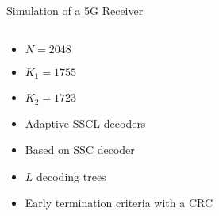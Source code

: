 \begin{frame}{Simulation of a 5G Receiver}
\begin{columns}
\begin{column}[T]{4cm}
    \begin{itemize}
      \item $N = 2048$
      \item $K_1 = 1755$
      \item $K_2 = 1723$
      \vspace{0.3cm}
      \item Adaptive SSCL decoders
      \item Based on SSC decoder
      \item $L$ decoding trees
      \item<3-> Early termination criteria with a CRC
    \end{itemize}
  \end{column}
  \end{columns}
\end{frame}

